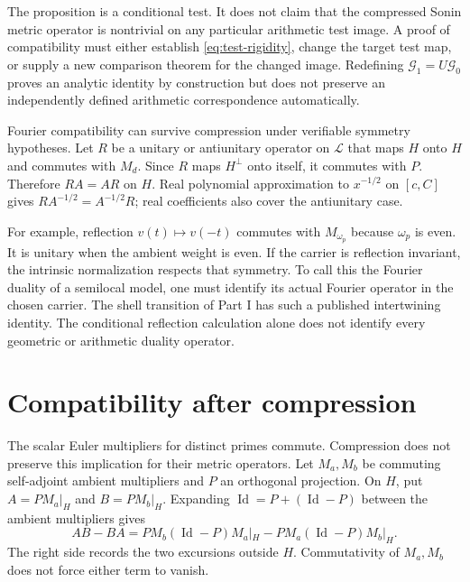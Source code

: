 \documentclass[11pt,letterpaper]{article}
\theoremstyle{definition}
\theoremstyle{remark}
\newcommand{\Id}{\operatorname{Id}}
\begin{document}
The proposition is a conditional test. It does not claim that
the compressed Sonin metric operator is nontrivial on any
particular arithmetic test image. A proof of compatibility
must either establish \eqref{eq:test-rigidity}, change the
target test map, or supply a new comparison theorem for the
changed image. Redefining $\mathcal G_1=U\mathcal G_0$ proves an
analytic identity by construction but does not preserve an
independently defined arithmetic correspondence automatically.

Fourier compatibility can survive compression under verifiable
symmetry hypotheses. Let $R$ be a unitary or antiunitary
operator on $\mathcal L$ that maps $H$ onto $H$ and commutes with
$M_d$. Since $R$ maps $H^\perp$ onto itself, it commutes with
$P$. Therefore $RA=AR$ on $H$. Real polynomial approximation
to $x^{-1/2}$ on $[c,C]$ gives $RA^{-1/2}=A^{-1/2}R$;
real coefficients also cover the antiunitary case.

For example, reflection $v(t)\mapsto v(-t)$ commutes with
$M_{\omega_p}$ because $\omega_p$ is even. It is unitary when the
ambient weight is even. If the carrier is reflection invariant,
the intrinsic normalization respects that symmetry. To call
this the Fourier duality of a semilocal model, one must identify
its actual Fourier operator in the chosen carrier. The shell
transition of Part I has such a published intertwining identity.
The conditional reflection calculation alone does not identify
every geometric or arithmetic duality operator.

\section{Compatibility after compression}
\label{sec:prime-compatibility}

The scalar Euler multipliers for distinct primes commute.
Compression does not preserve this implication for their
metric operators. Let $M_a,M_b$ be commuting self-adjoint
ambient multipliers and $P$ an orthogonal projection. On $H$,
put $A=PM_a|_H$ and $B=PM_b|_H$. Expanding $\Id=P+(\Id-P)$
between the ambient multipliers gives
\begin{equation}
 AB-BA=PM_b(\Id-P)M_a|_H-PM_a(\Id-P)M_b|_H.
 \label{eq:compression-commutator}
\end{equation}
The right side records the two excursions outside $H$.
Commutativity of $M_a,M_b$ does not force either term to vanish.
\end{document}
